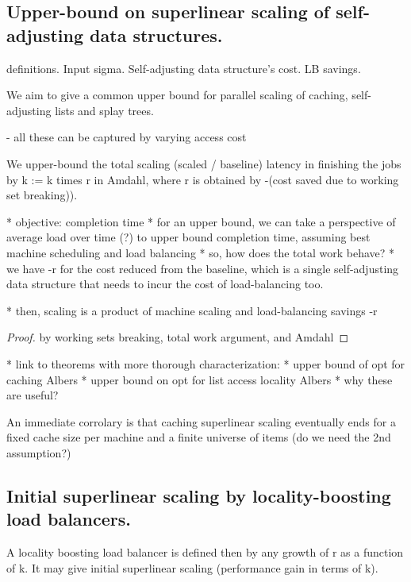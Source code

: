 \subsection{Upper-bound on superlinear scaling of self-adjusting data structures.}

definitions.
Input sigma.
Self-adjusting data structure's cost.
LB savings.

We aim to give a common upper bound for parallel scaling of caching, self-adjusting lists and splay trees.

- all these can be captured by varying access cost



\begin{theorem}
 We upper-bound the total scaling (scaled / baseline) latency in finishing the jobs by k := k times r in Amdahl, where r is obtained by -(cost saved due to working set breaking)).

* objective: completion time
* for an upper bound, we can take a perspective of average load over time (?) to upper bound completion time, assuming best machine scheduling and load balancing
* so, how does the total work behave?
    * we have -r for the cost reduced from the baseline, which is a single self-adjusting data structure that needs to incur the cost of load-balancing too.

* then, scaling is a product of machine scaling and load-balancing savings -r

 
\end{theorem}

\begin{proof}
  by working sets breaking, total work argument, and Amdahl
\end{proof}

* link to theorems with more thorough characterization:
    * upper bound of opt for caching Albers
    * upper bound on opt for list access locality Albers
    * why these are useful?


An immediate corrolary is that caching superlinear scaling eventually ends for a fixed cache size per machine and a finite universe of items (do we need the 2nd assumption?)


\subsection{Initial superlinear scaling by locality-boosting load balancers.}



A locality boosting load balancer is defined then by any growth of r as a function of k. It may give initial superlinear scaling (performance gain in terms of k).

